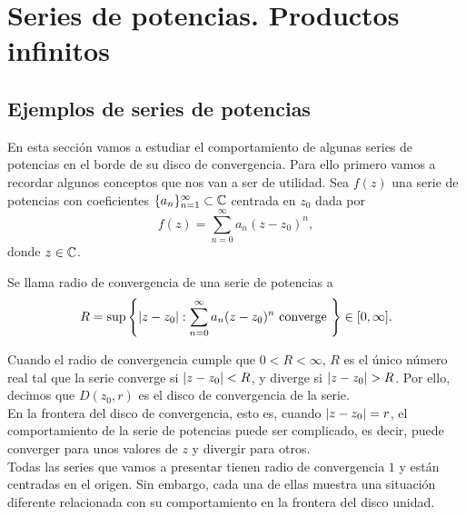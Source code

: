 \chapter{Series de potencias. Productos infinitos}
\label{cap:ejemplos}


\section{Ejemplos de series de potencias}
\label{sec:ejemplos}

En esta sección vamos a estudiar el comportamiento de algunas series de potencias en el borde de su disco de convergencia. Para ello primero vamos a recordar algunos conceptos que nos van a ser de utilidad. Sea $f(z)$ una serie de potencias con coeficientes $\{a_n\}_{n=1}^{\infty} \subset \mathbb{C}$ centrada en $z_0$ dada por
\begin{equation*}
    f(z) =  \sum_{n=0}^\infty a_n (z-z_0)^n,
\end{equation*}
donde $z \in \mathbb{C}$. \\

\begin{definition}
    Se llama radio de convergencia de una serie de potencias a
    \begin{equation*}
        R = \sup \left\{ \left\lvert z - z_0\right\rvert : \sum _{n=0}^{\infty} a_n (z - z_0)^n \text{ converge } \right\} \in [0, \infty].
    \end{equation*}
\end{definition}
\medskip

Cuando el radio de convergencia cumple que $0 < R < \infty$, $R$ es el único número real tal que la serie converge si $\left\lvert z - z_0\right\rvert < R$, y diverge si $\left\lvert z - z_0\right\rvert > R$. Por ello, decimos que $D(z_0,r)$ es el disco de convergencia de la serie. \\

En la frontera del disco de convergencia, esto es, cuando $\left\lvert z - z_0\right\rvert = r$, el comportamiento de la serie de potencias puede ser complicado, es decir, puede converger para unos valores de $z$ y divergir para otros. \\

Todas las series que vamos a presentar tienen radio de convergencia $1$ y están centradas en el origen. Sin embargo, cada una de ellas muestra una situación diferente relacionada con su comportamiento en la frontera del disco unidad. \\

